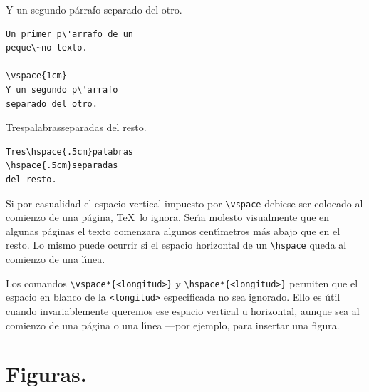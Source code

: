 {\begin{enumerate}
{\begin{minipage}[t]{5cm}
\vspace{1cm}
Y un segundo p\'arrafo separado del otro.
\end{minipage}
\hspace{2cm}
\begin{minipage}[t]{5cm}
\begin{verbatim}
Un primer p\'arrafo de un 
peque\~no texto.

\vspace{1cm}
Y un segundo p\'arrafo 
separado del otro.
\end{verbatim}
\end{minipage}

\vspace{.3cm}

\begin{minipage}[t]{5cm}
Tres\hspace{.5cm}palabras\hspace{.5cm}separadas del resto. 
\end{minipage}
\hspace{2cm}
\begin{minipage}[t]{5cm}
\begin{verbatim}
Tres\hspace{.5cm}palabras
\hspace{.5cm}separadas 
del resto. 
\end{verbatim}
\end{minipage}
}
\vspace{.3cm}

Si por casualidad el espacio vertical impuesto por \verb+\vspace+
debiese ser colocado al comienzo de una p{\'a}gina, \TeX\ lo ignora.
Ser\'{\i}a molesto visualmente que en algunas p{\'a}ginas el texto
comenzara algunos cent\'{\i}metros m{\'a}s abajo que en el resto. Lo
mismo puede ocurrir si el espacio horizontal de  un \verb+\hspace+ queda al
comienzo de una l\'{\i}nea. 

Los comandos
\verb+\vspace*{<longitud>}+ y \verb+\hspace*{<longitud>}+ permiten
que el espacio en blanco de la \verb+<longitud>+ especificada no sea
ignorado. Ello es {\'u}til cuando invariablemente queremos ese
espacio vertical u horizontal, aunque sea al comienzo de una p{\'a}gina
o una l\'{\i}nea ---por ejemplo, para insertar una figura.  

\end{enumerate}


\section{Figuras.}
\label{figuras}

}
